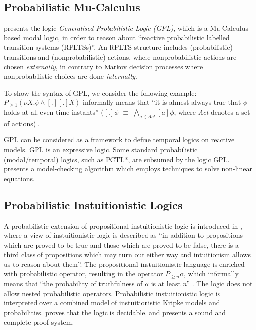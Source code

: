 \documentclass[11pt]{article}
\begin{document}
\subsection{Probabilistic Mu-Calculus}

\cite{CIN05} presents the logic \emph{Generalised Probabilistic Logic (GPL)}, which is a Mu-Calculus-based modal logic, in order to reason about ``reactive probabilistic labelled transition systems (RPLTSs)''. An RPLTS structure includes (probabilistic) transitions and (nonprobabilistic) actions, where nonprobabilistic actions are chosen \emph{externally}, in contrary to Markov decision processes where nonprobabilistic choices are done \emph{internally}. 

To show the syntax of GPL, we consider the following example: $P_{\geq 1}(\nu X.\phi \wedge [.][.]X)$ informally means that ``it is almost always true that $\phi$ holds at all even time instants'' ($[.]\phi$ $\equiv$ $\bigwedge_{a \in Act}[a]\phi$, where \emph{Act} denotes a set of actions) \cite{CIN05}.

GPL can be considered as a framework to define temporal logics on reactive models. GPL is an expressive logic. Some standard probabilistic (modal/temporal) logics, such as PCTL*, are subsumed by the logic GPL. \cite{CIN05} presents a model-checking algorithm which employs techniques to solve non-linear equations.

\subsection{Probabilistic Instuitionistic Logics}

A probabilistic extension of propositional instuitionistic logic is introduced in \cite{MOR03}, where a view of instuitionistic logic is described as ``in addition to propositions which are proved to be true and those which are proved to be false, there is a third class of propositions which may turn out either way and intuitionism allows us to reason about them''. The propositional instuitionistic language is enriched with probabilistic operator, resulting in the operator $P_{\geq n}\alpha$, which informally means that  ``the probability of truthfulness of $\alpha$ is at least \textit{n}'' \cite{MOR03}. The logic does not allow nested probabilistic operators. Probabilistic instuitionistic logic is interpreted over a combined model of instuitionistic Kripke models and probabilities. \cite{MOR03} proves that the logic is decidable, and presents a sound and complete proof system. 
\end{document}
